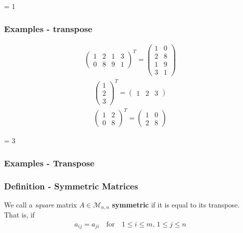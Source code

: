 \documentclass[usenames,dvipsnames,aspectratio=169,10pt]{beamer}
\def \EXAMPLEVERSION {3} %
\numberwithin{equation}{section}
\begin{document}
\ifnum \EXAMPLEVERSION = 1
\begin{frame}
\frametitle{Examples - transpose}
\begin{align*}
\begin{pmatrix}
1 & 2 & 1 & 3 \\
0 & 8 & 9 & 1
\end{pmatrix}^T
=
\begin{pmatrix}
1 & 0 \\
2 & 8 \\ 
1 & 9 \\
3 & 1
\end{pmatrix}
\end{align*}
\begin{align*}
\begin{pmatrix}
1 \\
2 \\ 
3 
\end{pmatrix}^T
=
\begin{pmatrix}
1 & 2 & 3 
\end{pmatrix}
\end{align*}
\begin{align*}
\begin{pmatrix}
1 & 2 \\
0 & 8 
\end{pmatrix}^T
=
\begin{pmatrix}
1 & 0 \\
2 & 8 
\end{pmatrix}
\end{align*}
\end{frame}
\fi 



\ifnum \EXAMPLEVERSION = 3
\begin{frame}
\frametitle{Examples - Transpose}
\end{frame}
\fi 

\begin{frame}
\frametitle{Definition - Symmetric Matrices}

We call a \textit{square} matrix $A \in \mathcal{M}_{n,n}$ \textbf{symmetric} if it is equal to its transpose. That is, if
\begin{align*}
a_{ij} = a_{ji} \quad \text{for} \quad 1 \leq i \leq m, \, 1 \leq j \leq n
\end{align*}

\end{frame}
\end{document}
